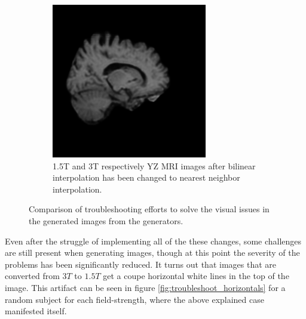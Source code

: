 \documentclass[12pt, fleqn, titlepage]{article}
\begin{document}
\begin{figure}[H]
\begin{subfigure}[b]{0.7\textwidth}
		\hfill
		\includegraphics[width=0.475\linewidth]{imgs/3T_no_noise}
		\caption{1.5T and 3T respectively YZ MRI images after bilinear interpolation has been changed to nearest neighbor interpolation.}
		\label{fig:troubleshootd}
	\end{subfigure}
	\caption{Comparison of troubleshooting efforts to solve the visual issues in the generated images from the generators.}
	\label{fig:troubleshoot}
\end{figure}
Even after the struggle of implementing all of the these changes, some challenges are still present when generating images, though at this point the severity of the problems has been significantly reduced. It turns out that images that are converted from $3T$ to $1.5T$ get a coupe horizontal white lines in the top of the image. This artifact can be seen in figure \ref{fig:troubleshoot_horizontals} for a random subject for each field-strength, where the above explained case manifested itself.
\end{document}

